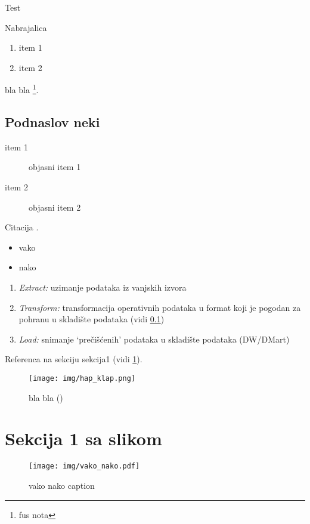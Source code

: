 \documentclass[times, utf8, seminar]{fit}
\begin{document}
Test

Nabrajalica

\begin{enumerate}
  \item item 1
  \item item 2
\end{enumerate}

bla bla \footnote{fus nota}.

\subsection{Podnaslov neki}

\label{labela_oznaka}

\begin{description}
  \item [item 1]  objasni item 1
  \item [item 2] objasni item 2
\end{description}
 

Citacija \cite[str.~391]{pentaho32}.

\begin{itemize}
   \item vako 
   \item nako
\end{itemize}

\begin{enumerate}
  \item \emph{Extract:}  uzimanje podataka iz vanjskih izvora
  \item \emph{Transform:} transformacija operativnih podataka u format koji je pogodan za pohranu u skladište podataka (vidi \ref{labela_oznaka})
  \item \emph{Load:} snimanje `prečišćenih' podataka u skladište podataka (DW/DMart)
\end{enumerate}
 

Referenca na sekciju sekcija1 (vidi \ref{sect:sekcija1}).

 
\begin{figure}[H]
\centering
\texttt{[image: img/hap\_klap.png]}
\caption{bla bla (\cite{web:eric})}
\end{figure}

\section{Sekcija 1 sa slikom}
\label{sect:sekcija1}

\begin{figure}[H]
\centering
\texttt{[image: img/vako\_nako.pdf]}
\caption{vako nako caption}
\end{figure}
\end{document}
